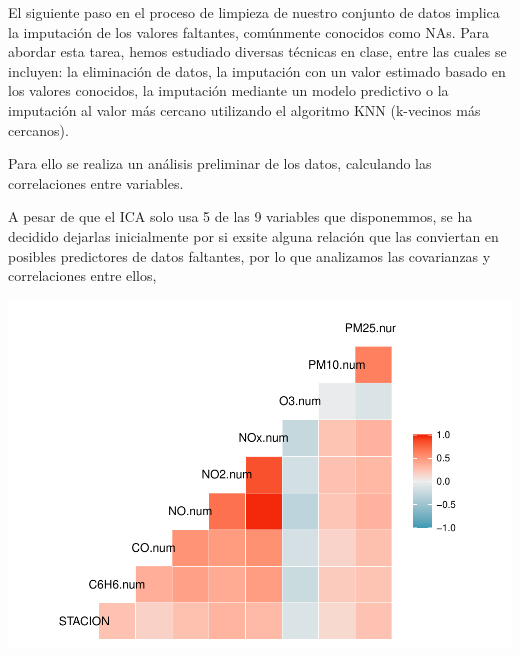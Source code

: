 \documentclass[notspecified,article,submit,moreauthors,pdftex]{Definitions/mdpi}
\begin{document}
El siguiente paso en el proceso de limpieza de nuestro conjunto de datos
implica la imputación de los valores faltantes, comúnmente conocidos
como NAs. Para abordar esta tarea, hemos estudiado diversas técnicas en
clase, entre las cuales se incluyen: la eliminación de datos, la
imputación con un valor estimado basado en los valores conocidos, la
imputación mediante un modelo predictivo o la imputación al valor más
cercano utilizando el algoritmo KNN (k-vecinos más cercanos).

Para ello se realiza un análisis preliminar de los datos, calculando las
correlaciones entre variables.

A pesar de que el ICA solo usa 5 de las 9 variables que disponemmos, se
ha decidido dejarlas inicialmente por si exsite alguna relación que las
conviertan en posibles predictores de datos faltantes, por lo que
analizamos las covarianzas y correlaciones entre ellos,

\includegraphics{ProyectoAED2023_files/figure-latex/unnamed-chunk-12-1.pdf}
\end{document}
